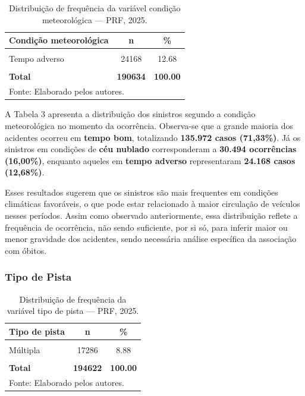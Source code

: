\documentclass[
  brazilian,
  12pt,
]{article}
\begin{document}
\begingroup\fontsize{11}{13}\selectfont

\begin{longtable}[t]{lcc}
\caption{\label{tab:tab3}Distribuição de frequência da variável condição meteorológica — PRF, 2025.}\\
\toprule
Condição meteorológica & n & \%\\
\midrule
\cellcolor{gray!10}{Nublado} & \cellcolor{gray!10}{30494} & \cellcolor{gray!10}{16.00}\\
Tempo adverso & 24168 & 12.68\\
\cellcolor{gray!10}{Tempo bom} & \cellcolor{gray!10}{135972} & \cellcolor{gray!10}{71.33}\\
\textbf{Total} & \textbf{190634} & \textbf{100.00}\\
\bottomrule
\multicolumn{3}{l}{\rule{0pt}{1em}Fonte: Elaborado pelos autores.}\\
\end{longtable}
\endgroup{}

A Tabela 3 apresenta a distribuição dos sinistros segundo a condição
meteorológica no momento da ocorrência. Observa-se que a grande maioria
dos acidentes ocorreu em \textbf{tempo bom}, totalizando \textbf{135.972
casos (71,33\%)}. Já os sinistros em condições de \textbf{céu nublado}
corresponderam a \textbf{30.494 ocorrências (16,00\%)}, enquanto aqueles
em \textbf{tempo adverso} representaram \textbf{24.168 casos (12,68\%)}.

Esses resultados sugerem que os sinistros são mais frequentes em
condições climáticas favoráveis, o que pode estar relacionado à maior
circulação de veículos nesses períodos. Assim como observado
anteriormente, essa distribuição reflete a frequência de ocorrência, não
sendo suficiente, por si só, para inferir maior ou menor gravidade dos
acidentes, sendo necessária análise específica da associação com óbitos.

\subsubsection{Tipo de Pista}\label{tipo-de-pista}

\begingroup\fontsize{11}{13}\selectfont

\begin{longtable}[t]{lcc}
\caption{\label{tab:tab4}Distribuição de frequência da variável tipo de pista — PRF, 2025.}\\
\toprule
Tipo de pista & n & \%\\
\midrule
\cellcolor{gray!10}{Dupla} & \cellcolor{gray!10}{77245} & \cellcolor{gray!10}{39.69}\\
Múltipla & 17286 & 8.88\\
\cellcolor{gray!10}{Simples} & \cellcolor{gray!10}{100091} & \cellcolor{gray!10}{51.43}\\
\textbf{Total} & \textbf{194622} & \textbf{100.00}\\
\bottomrule
\multicolumn{3}{l}{\rule{0pt}{1em}Fonte: Elaborado pelos autores.}\\
\end{longtable}
\endgroup{}
\end{document}
